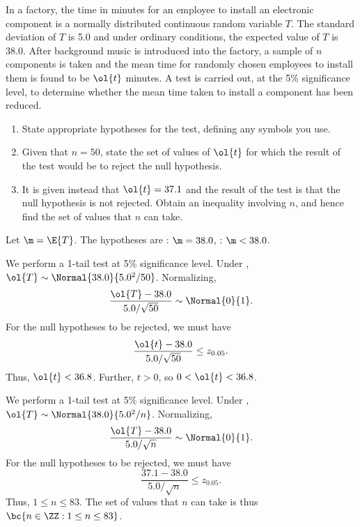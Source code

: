 \begin{problem}
    In a factory, the time in minutes for an employee to install an electronic component is a normally distributed continuous random variable $T$. The standard deviation of $T$ is 5.0 and under ordinary conditions, the expected value of $T$ is 38.0. After background music is introduced into the factory, a sample of $n$ components is taken and the mean time for randomly chosen employees to install them is found to be $\ol{t}$ minutes. A test is carried out, at the 5\% significance level, to determine whether the mean time taken to install a component has been reduced.

    \begin{enumerate}
        \item State appropriate hypotheses for the test, defining any symbols you use.
        \item Given that $n=50$, state the set of values of $\ol{t}$ for which the result of the test would be to reject the null hypothesis.
        \item It is given instead that $\ol{t}=37.1$ and the result of the test is that the null hypothesis is not rejected. Obtain an inequality involving $n$, and hence find the set of values that $n$ can take.
    \end{enumerate}
\end{problem}
\begin{solution}
    \begin{ppart}
        Let $\m = \E{T}$. The hypotheses are \nullhyp: $\m = 38.0$, \althyp: $\m < 38.0$.
    \end{ppart}
    \begin{ppart}
        We perform a 1-tail test at 5\% significance level. Under \nullhyp, $\ol{T} \sim \Normal{38.0}{5.0^2/50}$. Normalizing, \[\frac{\ol{T} - 38.0}{5.0/\sqrt{50}} \sim \Normal{0}{1}.\] For the null hypotheses to be rejected, we must have \[\frac{\ol{t} - 38.0}{5.0/\sqrt{50}} \leq z_{0.05}.\] Thus, $\ol{t} < 36.8$. Further, $t > 0$, so $0 < \ol{t} < 36.8$.
    \end{ppart}
    \begin{ppart}
        We perform a 1-tail test at 5\% significance level. Under \nullhyp, $\ol{T} \sim \Normal{38.0}{5.0^2/n}$. Normalizing, \[\frac{\ol{T} - 38.0}{5.0/\sqrt{n}} \sim \Normal{0}{1}.\] For the null hypotheses to be rejected, we must have \[\frac{37.1 - 38.0}{5.0/\sqrt{n}} \leq z_{0.05}.\] Thus, $1 \leq n \leq 83$. The set of values that $n$ can take is thus $\bc{n \in \ZZ : 1 \leq n \leq 83}$.
    \end{ppart}
\end{solution}

